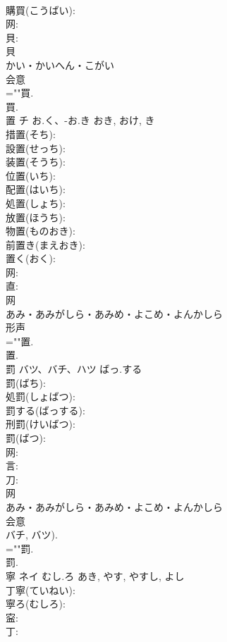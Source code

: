 \documentclass[8pt]{extreport}
\begin{document}
\begin{CJK}{UTF8}{min}
\\	購買(こうばい): 
\\	网: 
\\	貝: 
\\	貝	
\\	かい・かいへん・こがい	
\\	会意 
\\	=""買.
\\	買.
\\	置	チ	お.く、-お.き	おき, おけ, き	
\\	措置(そち): 
\\	設置(せっち): 
\\	装置(そうち): 
\\	位置(いち): 
\\	配置(はいち): 
\\	処置(しょち): 
\\	放置(ほうち): 
\\	物置(ものおき): 
\\	前置き(まえおき): 
\\	置く(おく): 
\\	网: 
\\	直: 
\\	网	
\\	あみ・あみがしら・あみめ・よこめ・よんかしら	
\\	形声 
\\	=""置.
\\	置.
\\	罰	バツ、バチ、ハツ	ばっ.する		
\\	罰(ばち): 
\\	処罰(しょばつ): 
\\	罰する(ばっする): 
\\	刑罰(けいばつ): 
\\	罰(ばつ): 
\\	网: 
\\	言: 
\\	刀: 
\\	网	
\\	あみ・あみがしら・あみめ・よこめ・よんかしら	
\\	会意 
\\	バチ, バツ).	
\\	=""罰.
\\	罰.
\\	寧	ネイ	むし.ろ	あき, やす, やすし, よし	
\\	丁寧(ていねい): 
\\	寧ろ(むしろ): 
\\	寍: 
\\	丁: 

\end{CJK}
\end{document}
